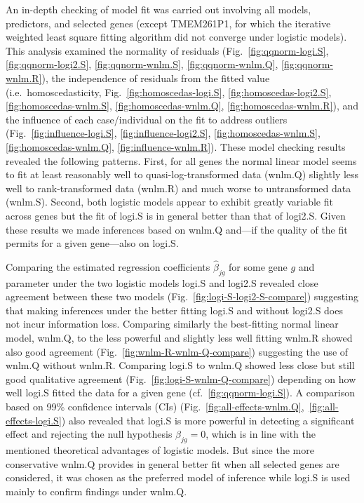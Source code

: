 \documentclass[letterpaper]{article}
\begin{document}
An in-depth checking of model fit was carried out involving all models,
predictors, and selected genes (except TMEM261P1, for which the iterative
weighted least square fitting algorithm did not converge under logistic
models).  This analysis examined the normality of residuals
(Fig.~\ref{fig:qqnorm-logi.S}, \ref{fig:qqnorm-logi2.S},
\ref{fig:qqnorm-wnlm.S}, \ref{fig:qqnorm-wnlm.Q}, \ref{fig:qqnorm-wnlm.R}),
the independence of residuals from the fitted value (i.e.~homoscedasticity,
Fig.~\ref{fig:homoscedas-logi.S}, \ref{fig:homoscedas-logi2.S},
\ref{fig:homoscedas-wnlm.S}, \ref{fig:homoscedas-wnlm.Q},
\ref{fig:homoscedas-wnlm.R}), and the influence of each case/individual on the
fit to address outliers (Fig.~\ref{fig:influence-logi.S},
\ref{fig:influence-logi2.S}, \ref{fig:homoscedas-wnlm.S},
\ref{fig:homoscedas-wnlm.Q}, \ref{fig:influence-wnlm.R}).  These model
checking results revealed the following patterns.  First, for all genes the
normal linear model seems to fit at
least reasonably well to quasi-log-transformed data (wnlm.Q) slightly less
well to rank-transformed data (wnlm.R) and much worse to untransformed data
(wnlm.S).  Second, both logistic models appear to exhibit greatly variable
fit across genes but the fit of logi.S is in general better than that of
logi2.S.  Given these results we made inferences based on wnlm.Q and---if the
quality of the fit permits for a given gene---also on logi.S.

Comparing the estimated regression coefficients \(\hat{\beta}_{jg}\) for some
gene \(g\) and parameter under the two logistic models logi.S and logi2.S
revealed close agreement between these two models
(Fig.~\ref{fig:logi-S-logi2-S-compare}) suggesting that making inferences
under the better fitting logi.S and without logi2.S does not incur information
loss.  Comparing similarly the best-fitting normal linear model, wnlm.Q, to
the less powerful and slightly less well fitting wnlm.R showed also good
agreement (Fig.~\ref{fig:wnlm-R-wnlm-Q-compare}) suggesting the use of wnlm.Q
without wnlm.R.  Comparing logi.S to wnlm.Q showed less close but still good
qualitative agreement (Fig.~\ref{fig:logi-S-wnlm-Q-compare}) depending on how
well logi.S fitted the data for a given gene (cf.~\ref{fig:qqnorm-logi.S}).  A
comparison based on 99\% confidence intervals (CIs)
(Fig.~\ref{fig:all-effects-wnlm.Q},~\ref{fig:all-effects-logi.S}) also
revealed that logi.S is more powerful in detecting a significant effect and
rejecting the null hypothesis \(\beta_{jg}=0\), which is in line with the
mentioned theoretical advantages of logistic models.  But since the more
conservative wnlm.Q provides in general better fit when all selected genes are
considered, it was chosen as the preferred model of inference while logi.S is used mainly
to confirm findings under wnlm.Q.
\end{document}
